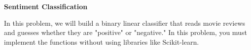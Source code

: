 \item {\bf Sentiment Classification}

In this problem, we will build a binary linear classifier that reads movie
reviews and guesses whether they are "positive" or "negative." In this problem,
you must implement the functions without using libraries like Scikit-learn.

\begin{enumerate}

  

  

  

  

  

  

  

  

\end{enumerate}
